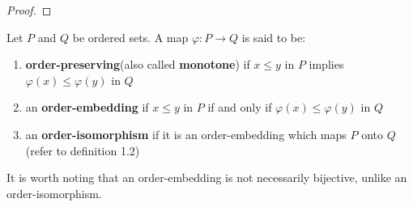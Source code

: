 \begin{proof}

\end{proof}

\begin{definition}
Let $P$ and $Q$ be ordered sets. A map $\varphi: P \rightarrow Q$ is said to be:
\begin{enumerate}
\item \textbf{order-preserving}(also called \textbf{monotone}) if $x \leq y$ in $P$  implies $\varphi(x) \leq \varphi(y)$ in $Q$
\item an \textbf{order-embedding} if $x \leq y$ in $P$ if and only if $\varphi(x) \leq \varphi(y)$ in $Q$
\item an \textbf{order-isomorphism} if it is an order-embedding which maps $P$ onto $Q$ (refer to definition 1.2)
\end{enumerate}
\end{definition}

\begin{remark}
It is worth noting that an order-embedding is not necessarily bijective, unlike an order-isomorphism.
\end{remark}

